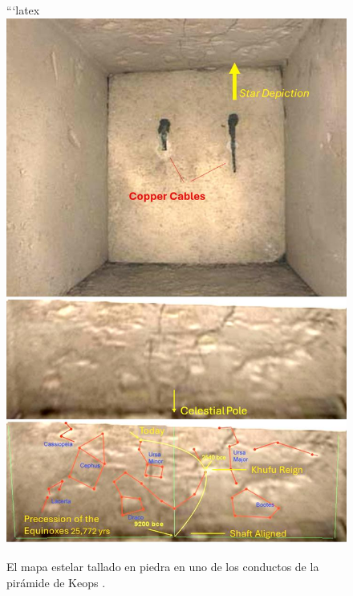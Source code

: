 \documentclass[10pt,twocolumn,letterpaper]{article}
\begin{document}
\begin{figure}[H]
\begin{center}
```latex
   \includegraphics[width=1\linewidth]{star-stone.jpg}
\end{center}
   \caption{El mapa estelar tallado en piedra en uno de los conductos de la pirámide de Keops \cite{28}.}
\label{fig:20}
\label{fig:onecol}
\end{figure}
\end{document}
